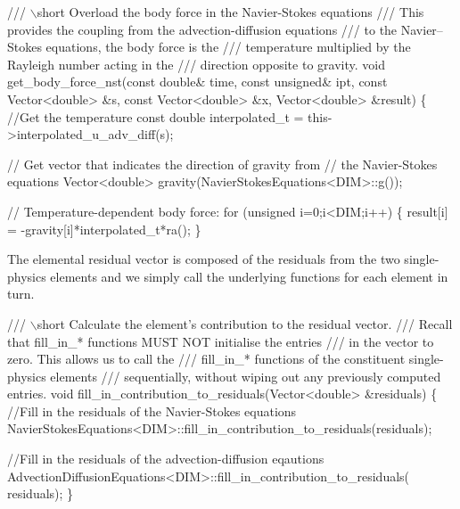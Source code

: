  
\begin{DoxyCodeInclude}
 \textcolor{comment}{/// \(\backslash\)short Overload the body force in the Navier-Stokes equations}
\textcolor{comment}{ /// This provides the coupling from the advection-diffusion equations}
\textcolor{comment}{}\textcolor{comment}{ /// to the Navier--Stokes equations, the body force is the}
\textcolor{comment}{}\textcolor{comment}{ /// temperature multiplied by the Rayleigh number acting in the}
\textcolor{comment}{}\textcolor{comment}{ /// direction opposite to gravity. }
\textcolor{comment}{} \textcolor{keywordtype}{void} get\_body\_force\_nst(\textcolor{keyword}{const} \textcolor{keywordtype}{double}& time, \textcolor{keyword}{const} \textcolor{keywordtype}{unsigned}& ipt,
                         \textcolor{keyword}{const} Vector<double> &s, \textcolor{keyword}{const} Vector<double> &x,
                         Vector<double> &result)
  \{
   \textcolor{comment}{//Get the temperature}
   \textcolor{keyword}{const} \textcolor{keywordtype}{double} interpolated\_t = this->interpolated\_u\_adv\_diff(s);

   \textcolor{comment}{// Get vector that indicates the direction of gravity from}
   \textcolor{comment}{// the Navier-Stokes equations}
   Vector<double> gravity(NavierStokesEquations<DIM>::g());
   
   \textcolor{comment}{// Temperature-dependent body force:}
   \textcolor{keywordflow}{for} (\textcolor{keywordtype}{unsigned} i=0;i<DIM;i++)
    \{
     result[i] = -gravity[i]*interpolated\_t*ra();
    \}

\end{DoxyCodeInclude}


The elemental residual vector is composed of the residuals from the two single-\/physics elements and we simply call the underlying functions for each element in turn.

 
\begin{DoxyCodeInclude}
 \textcolor{comment}{/// \(\backslash\)short Calculate the element's contribution to the residual vector.}
\textcolor{comment}{ /// Recall that fill\_in\_* functions MUST NOT initialise the entries }
\textcolor{comment}{}\textcolor{comment}{ /// in the vector to zero. This allows us to call the }
\textcolor{comment}{}\textcolor{comment}{ /// fill\_in\_* functions of the constituent single-physics elements}
\textcolor{comment}{}\textcolor{comment}{ /// sequentially, without wiping out any previously computed entries.}
\textcolor{comment}{} \textcolor{keywordtype}{void} fill\_in\_contribution\_to\_residuals(Vector<double> &residuals)
  \{
   \textcolor{comment}{//Fill in the residuals of the Navier-Stokes equations}
   NavierStokesEquations<DIM>::fill\_in\_contribution\_to\_residuals(residuals);

   \textcolor{comment}{//Fill in the residuals of the advection-diffusion eqautions}
   AdvectionDiffusionEquations<DIM>::fill\_in\_contribution\_to\_residuals(
    residuals);
  \}

\end{DoxyCodeInclude}



